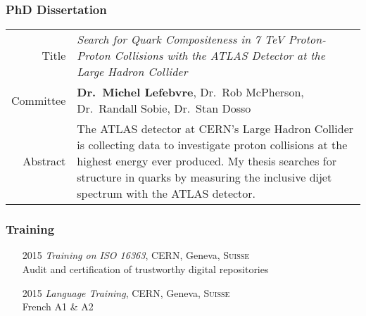 \documentclass[12pt,a4paper]{article}
\begin{document}
\subsubsection*{PhD Dissertation}
\begin{tabular}{r p{14.3cm}}
	Title     & {\it Search for Quark Compositeness in 7 TeV Proton-Proton
							 Collisions with the ATLAS Detector at the Large Hadron
							 Collider} \\
	Committee & {\bf Dr.\ Michel Lefebvre}, Dr.\ Rob McPherson,
							 Dr.\ Randall Sobie, Dr.\ Stan Dosso \\
	Abstract  & {\small The ATLAS detector at CERN's Large Hadron Collider is
	             collecting data to investigate proton collisions at the highest
							 energy ever produced. My thesis searches for structure in quarks
							 by measuring the inclusive dijet spectrum with the ATLAS
							 detector.} \\
\end{tabular}





\subsubsection*{Training}
\begin{itemize}
	\item[2015] \emph{Training on ISO 16363}, {CERN}, Geneva, \textsc{Suisse}\\
	{\small Audit and certification of trustworthy digital repositories}
	\item[2015] \emph{Language Training}, {CERN}, Geneva, \textsc{Suisse}\\
	{\small French A1 \& A2}
\end{itemize}
\end{document}
